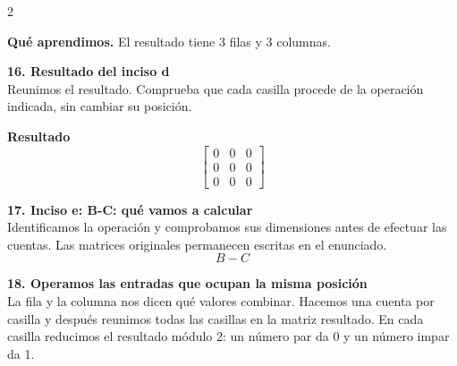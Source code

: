\documentclass[11pt,a4paper,landscape]{article}
\begin{document}
\begin{multicols*}{2}
\begin{minipage}{\linewidth}
\par\smallskip\textbf{Qué aprendimos.} El resultado tiene 3 filas y 3 columnas.
\end{minipage}\par\medskip
\noindent\begin{minipage}{\linewidth}\textbf{16. Resultado del inciso d}\\[2pt]Reunimos el resultado. Comprueba que cada casilla procede de la operación indicada, sin cambiar su posición.
\par\smallskip \textbf{Resultado}\[\begin{bmatrix}0 & 0 & 0\\0 & 0 & 0\\0 & 0 & 0\end{bmatrix}\]
\end{minipage}\par\medskip
\noindent\begin{minipage}{\linewidth}\textbf{17. Inciso e: B-C: qué vamos a calcular}\\[2pt]Identificamos la operación y comprobamos sus dimensiones antes de efectuar las cuentas. Las matrices originales permanecen escritas en el enunciado.
\[B-C\]
\end{minipage}\par\medskip
\noindent\begin{minipage}{\linewidth}\textbf{18. Operamos las entradas que ocupan la misma posición}\\[2pt]La fila y la columna nos dicen qué valores combinar. Hacemos una cuenta por casilla y después reunimos todas las casillas en la matriz resultado. En cada casilla reducimos el resultado módulo 2: un número par da 0 y un número impar da 1.
\par{}\par\smallskip

\end{minipage}
\end{multicols*}
\end{document}
